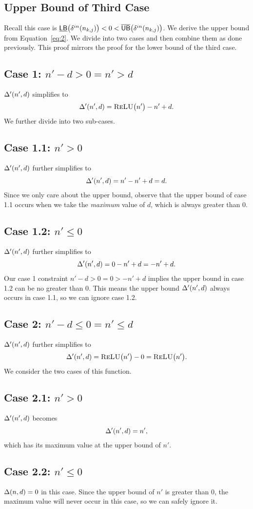 \subsection{Upper Bound of Third Case}
Recall this case is $ \underline{\mathsf{LB}}\big(\delta^{in}(n_{k,j})\big) < 0 < \overline{\mathsf{UB}}\big(\delta^{in}(n_{k,j})\big) $. We derive the upper bound from Equation~\ref{eq:2}. We divide into two cases and then combine them as done previously. This proof mirrors the proof for the lower bound of the third case.

\subsection*{Case 1: $ n' - d > 0 = n' > d $}
$ \Delta'(n',d) $ simplifies to
\[
\Delta'(n',d) = \textsc{ReLU}\big(n'\big) - n' + d.
\]
We further divide into two sub-cases.

\subsection*{Case 1.1: $ n' > 0 $}
$ \Delta'(n',d) $ further simplifies to
\[
\Delta'(n',d) = n' - n' + d = d.
\]
Since we only care about the upper bound, observe that the upper bound of
case 1.1 occurs when we take the \textit{maximum} value of $ d $, which is always greater than 0.

\subsection*{Case 1.2: $ n' \leq 0 $}
$ \Delta'(n',d) $ further simplifies to
\[
\Delta'(n',d) = 0 - n' + d = -n' + d.
\]
Our case 1 constraint $ n' - d > 0 = 0 > -n' + d $ implies the upper bound in case 1.2
can be no greater than 0. This means the upper bound $ \Delta'(n',d) $ always occurs in case 1.1, so we
can ignore case 1.2.

\subsection*{Case 2: $ n' - d \leq 0 = n' \leq d $}
$ \Delta'(n',d) $ further simplifies to
\[
\Delta'(n',d) = \textsc{ReLU}\big(n'\big) - 0 = \textsc{ReLU}\big(n'\big).
\]
We consider the two cases of this function.
\subsection*{Case 2.1: $ n' > 0 $}
$ \Delta'(n',d) $ becomes
\[
	\Delta'(n',d) = n',
\]
which has its maximum value at the upper bound of $ n' $.

\subsection*{Case 2.2: $ n' \leq 0 $}
$ \Delta(n,d) = 0 $ in this case. Since the upper bound of $ n' $ is greater than 0, the maximum value will never occur in this case, so we can safely ignore it.


